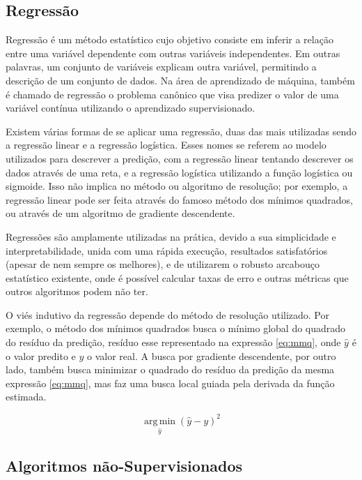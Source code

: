 \documentclass{article}
\begin{document}
\subsection{Regressão}

Regressão é um método estatístico cujo objetivo consiste em inferir a relação entre uma variável dependente com outras variáveis independentes.
Em outras palavras, um conjunto de variáveis explicam outra variável, permitindo a descrição de um conjunto de dados.
Na área de aprendizado de máquina, também é chamado de regressão o problema canônico
que visa predizer o valor de uma variável contínua utilizando o aprendizado supervisionado.

Existem várias formas de se aplicar uma regressão,
duas das mais utilizadas sendo a regressão linear e a regressão logística.
Esses nomes se referem ao modelo utilizados para descrever a predição,
com a regressão linear tentando descrever os dados através de uma reta,
e a regressão logística utilizando a função logística ou sigmoide.
Isso não implica no método ou algoritmo de resolução;
por exemplo, a regressão linear pode ser feita
através do famoso método dos mínimos quadrados,
ou através de um algoritmo de gradiente descendente.

Regressões são amplamente utilizadas na prática,
devido a sua simplicidade e interpretabilidade,
unida com uma rápida execução, resultados satisfatórios (apesar de nem sempre os melhores),
e de utilizarem o robusto arcabouço estatístico existente,
onde é possível calcular taxas de erro e outras métricas que outros algoritmos podem não ter.

O viés indutivo da regressão depende do método de resolução utilizado.
Por exemplo, o método dos mínimos quadrados busca o mínimo global
do quadrado do resíduo da predição, resíduo esse representado na expressão \ref{eq:mmq},
onde $\hat{y}$ é o valor predito e $y$ o valor real.
A busca por gradiente descendente, por outro lado,
também busca minimizar o quadrado do resíduo da predição da mesma expressão \ref{eq:mmq},
mas faz uma busca local guiada pela derivada da função estimada.

\begin{equation}
\operatorname*{arg\,min}_{\hat{y}} (\hat{y} - y)^2
\label{eq:mmq}
\end{equation}

\subsection{Algoritmos não-Supervisionados}
\end{document}
